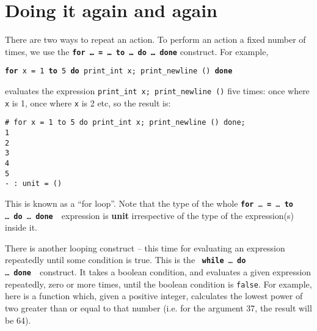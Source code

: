 \documentclass[]{book}
\newcommand{\pfor}{\textbf{for}\xspace}
\newcommand{\pto}{\textbf{to}\xspace}
\newcommand{\pdo}{\textbf{do}\xspace}
\newcommand{\pdone}{\textbf{done}\xspace}
\newcommand{\smspace}{\vspace{4mm}}
\begin{document}
\section*{Doing it again and again}

There are two ways to repeat an action. To perform an action a fixed number of times, we use the \texttt{\textbf{for\! \ldots\ \!= \!\ldots\ \!to \ldots\ \!do \ldots\ \!done}} construct. For example,  

\smspace
  \texttt{\pfor x = 1 \pto 5 \pdo print\_int x; print\_newline () \pdone}
\smspace

\noindent evaluates the expression \texttt{print\_int\! x;\! print\_newline\! ()} five times: once where \texttt{x} is 1, once where \texttt{x} is 2 etc, so the result is:

\smspace
\noindent\verb$# for x = 1 to 5 do print_int x; print_newline () done;$\\
\noindent\verb!1!\\
\noindent\verb!2!\\
\noindent\verb!3!\\
\noindent\verb!4!\\
\noindent\verb!5!\\
\noindent\verb!- : unit = ()!
\smspace

\noindent This is known as a ``for loop''. Note that the type of the whole \texttt{\textbf{for}\! \ldots\ \!\textbf{=} \!\ldots\ \!\textbf{to} \!\ldots\ \!\textbf{do} \!\ldots\ \!\textbf{done}}\ \ expression is \textbf{\textsf{unit}} irrespective of the type of the expression(s) inside it.

There is another looping construct -- this time for evaluating an expression repeatedly until some condition is true. This is the \ \texttt{\textbf{while}\! \ldots\ \!\textbf{do}\! \ldots\ \!\textbf{done}}\ \ construct. It takes a boolean condition, and evaluates a given expression repeatedly, zero or more times, until the boolean condition is \texttt{false}. For example, here is a function which, given a positive integer, calculates the lowest power of two greater than or equal to that number (i.e. for the argument 37, the result will be 64).
\end{document}
